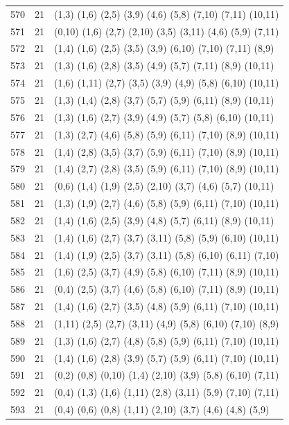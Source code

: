 {\begin{longtable}{lll}
570 & 21 & (1,3) (1,6) (2,5) (3,9) (4,6) (5,8) (7,10) (7,11) (10,11) \\
571 & 21 & (0,10) (1,6) (2,7) (2,10) (3,5) (3,11) (4,6) (5,9) (7,11) \\
572 & 21 & (1,4) (1,6) (2,5) (3,5) (3,9) (6,10) (7,10) (7,11) (8,9) \\
573 & 21 & (1,3) (1,6) (2,8) (3,5) (4,9) (5,7) (7,11) (8,9) (10,11) \\
574 & 21 & (1,6) (1,11) (2,7) (3,5) (3,9) (4,9) (5,8) (6,10) (10,11) \\
575 & 21 & (1,3) (1,4) (2,8) (3,7) (5,7) (5,9) (6,11) (8,9) (10,11) \\
576 & 21 & (1,3) (1,6) (2,7) (3,9) (4,9) (5,7) (5,8) (6,10) (10,11) \\
577 & 21 & (1,3) (2,7) (4,6) (5,8) (5,9) (6,11) (7,10) (8,9) (10,11) \\
578 & 21 & (1,4) (2,8) (3,5) (3,7) (5,9) (6,11) (7,10) (8,9) (10,11) \\
579 & 21 & (1,4) (2,7) (2,8) (3,5) (5,9) (6,11) (7,10) (8,9) (10,11) \\
580 & 21 & (0,6) (1,4) (1,9) (2,5) (2,10) (3,7) (4,6) (5,7) (10,11) \\
581 & 21 & (1,3) (1,9) (2,7) (4,6) (5,8) (5,9) (6,11) (7,10) (10,11) \\
582 & 21 & (1,4) (1,6) (2,5) (3,9) (4,8) (5,7) (6,11) (8,9) (10,11) \\
583 & 21 & (1,4) (1,6) (2,7) (3,7) (3,11) (5,8) (5,9) (6,10) (10,11) \\
584 & 21 & (1,4) (1,9) (2,5) (3,7) (3,11) (5,8) (6,10) (6,11) (7,10) \\
585 & 21 & (1,6) (2,5) (3,7) (4,9) (5,8) (6,10) (7,11) (8,9) (10,11) \\
586 & 21 & (0,4) (2,5) (3,7) (4,6) (5,8) (6,10) (7,11) (8,9) (10,11) \\
587 & 21 & (1,4) (1,6) (2,7) (3,5) (4,8) (5,9) (6,11) (7,10) (10,11) \\
588 & 21 & (1,11) (2,5) (2,7) (3,11) (4,9) (5,8) (6,10) (7,10) (8,9) \\
589 & 21 & (1,3) (1,6) (2,7) (4,8) (5,8) (5,9) (6,11) (7,10) (10,11) \\
590 & 21 & (1,4) (1,6) (2,8) (3,9) (5,7) (5,9) (6,11) (7,10) (10,11) \\
591 & 21 & (0,2) (0,8) (0,10) (1,4) (2,10) (3,9) (5,8) (6,10) (7,11) \\
592 & 21 & (0,4) (1,3) (1,6) (1,11) (2,8) (3,11) (5,9) (7,10) (7,11) \\
593 & 21 & (0,4) (0,6) (0,8) (1,11) (2,10) (3,7) (4,6) (4,8) (5,9) \\

\end{longtable}}
